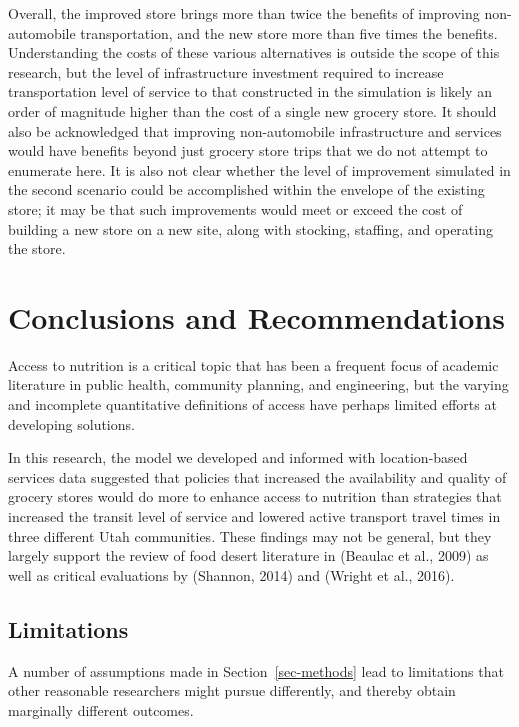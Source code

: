 \documentclass[
  letterpaper,
  number,
  review,
  3p]{elsarticle}
\begin{document}
Overall, the improved store brings more than twice the benefits of
improving non-automobile transportation, and the new store more than
five times the benefits. Understanding the costs of these various
alternatives is outside the scope of this research, but the level of
infrastructure investment required to increase transportation level of
service to that constructed in the simulation is likely an order of
magnitude higher than the cost of a single new grocery store. It should
also be acknowledged that improving non-automobile infrastructure and
services would have benefits beyond just grocery store trips that we do
not attempt to enumerate here. It is also not clear whether the level of
improvement simulated in the second scenario could be accomplished
within the envelope of the existing store; it may be that such
improvements would meet or exceed the cost of building a new store on a
new site, along with stocking, staffing, and operating the store.


\section{Conclusions and Recommendations}\label{sec-conclude}

Access to nutrition is a critical topic that has been a frequent focus
of academic literature in public health, community planning, and
engineering, but the varying and incomplete quantitative definitions of
access have perhaps limited efforts at developing solutions.

In this research, the model we developed and informed with
location-based services data suggested that policies that increased the
availability and quality of grocery stores would do more to enhance
access to nutrition than strategies that increased the transit level of
service and lowered active transport travel times in three different
Utah communities. These findings may not be general, but they largely
support the review of food desert literature in (Beaulac et al., 2009)
as well as critical evaluations by (Shannon, 2014) and (Wright et al.,
2016).

\subsection{Limitations}\label{sec-limitations}

A number of assumptions made in Section~\ref{sec-methods} lead to
limitations that other reasonable researchers might pursue differently,
and thereby obtain marginally different outcomes.
\end{document}
